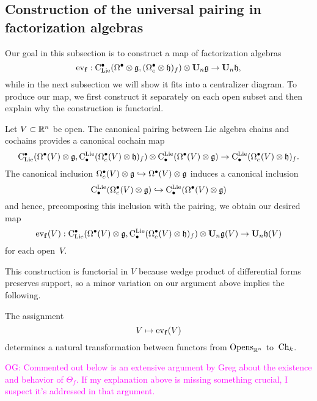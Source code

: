 \documentclass[11pt]{amsart}
\numberwithin{equation}{section}
\def\owen{\textcolor{magenta}{OG: }\textcolor{magenta}}
\begin{document}
\subsection{Construction of the universal pairing in factorization algebras}
\label{SS:constuctionthetaf}

Our goal in this subsection is to construct a map of factorization algebras
\[
{\rm ev}_{{\bf f}}: {\rm C}_{\rm Lie}^\bullet(\Omega^\bullet \otimes \mathfrak g, (\Omega^\bullet_c \otimes \mathfrak h)_f) \otimes \mathbf U_n \mathfrak g \to \mathbf U_n \mathfrak h,
\]
while in the next subsection we will show it fits into a centralizer diagram.
To produce our map, we first construct it separately on each open subset and then explain why the construction is functorial. 

Let $V \subset \mathbb R^n$ be open.
The canonical pairing between Lie algebra chains and cochains provides a canonical cochain map
\[
{\rm C}_{\rm Lie}^\bullet(\Omega^\bullet(V) \otimes \mathfrak g, {\rm C}^{\rm Lie}_\bullet(\Omega^\bullet_c(V) \otimes \mathfrak h)_f) \otimes {\rm C}^{\rm Lie}_\bullet(\Omega^\bullet(V) \otimes \mathfrak g) \to {\rm C}^{\rm Lie}_\bullet(\Omega^\bullet_c(V) \otimes \mathfrak h)_f.
\]
The canonical inclusion $\Omega^\bullet_c(V) \otimes \mathfrak g \hookrightarrow \Omega^\bullet(V) \otimes \mathfrak g$ induces a canonical inclusion 
\[
{\rm C}^{\rm Lie}_\bullet(\Omega^\bullet_c(V) \otimes \mathfrak g) \hookrightarrow {\rm C}^{\rm Lie}_\bullet(\Omega^\bullet(V) \otimes \mathfrak g)
\]
and hence, precomposing this inclusion with the pairing, we obtain our desired map
\[
{\rm ev}_{{\bf f}}(V): {\rm C}_{\rm Lie}^\bullet(\Omega^\bullet(V) \otimes \mathfrak g, {\rm C}^{\rm Lie}_\bullet(\Omega^\bullet_c(V) \otimes \mathfrak h)_f) \otimes \mathbf U_n \mathfrak g(V) \to \mathbf U_n \mathfrak h(V)
\]
for each open~$V$.

This construction is functorial in $V$ because wedge product of differential forms preserves support,
so a minor variation on our argument above implies the following.

\begin{lmm}
The assignment
\[
V \mapsto {\rm ev}_{{\bf f}}(V)
\]
determines a natural transformation between functors from ${\rm Opens}_{\mathbb R^n}$ to~${\rm Ch}_k$.
\end{lmm}

\owen{Commented out below is an extensive argument by Greg about the existence and behavior of $\Theta_f$. If my explanation above is missing something crucial, I suspect it's addressed in that argument.}
\end{document}
